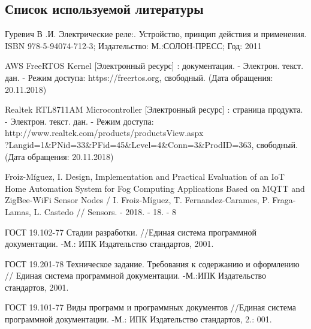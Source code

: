 \subsection*{ Список используемой литературы}
\begin{my_enumerate}

\item
Гуревич В .И. Электрические реле:. Устройство, принцип действия и применения. ISBN 978-5-94074-712-3; Издательство: М.:СОЛОН-ПРЕСС; Год: 2011 \\

\item
AWS FreeRTOS Kernel  [Электронный ресурс] : документация. - Электрон. текст. дан. - Режим доступа: https://freertos.org, свободный. (Дата обращения: 20.11.2018) \\

\item 	
Realtek RTL8711AM Microcontroller [Электронный ресурс] : страница продукта. - Электрон. текст. дан. - Режим доступа: http://www.realtek.com/products/productsView.aspx \\ 
?Langid=1\&PNid=33\&PFid=45\&Level=4\&Conn=3\&ProdID=363, свободный. (Дата обращения: 20.11.2018) \\

\item Froiz-Míguez, I. Design, Implementation and Practical Evaluation of an IoT Home Automation System for Fog Computing Applications Based on MQTT and ZigBee-WiFi Sensor Nodes / I. Froiz-Míguez, T. Fernandez-Carames, P. Fraga-Lamas, L. Castedo // Sensors. - 2018. - 18. - 8

\item
ГОСТ 19.102-77 Стадии разработки. //Единая система программной документации. -М.: ИПК Издательство стандартов, 2001.

\item
ГОСТ 19.201-78 Техническое задание. Требования к содержанию и оформлению // Единая система программной документации. -М.:ИПК Издательство стандартов, 2001.

\item
ГОСТ 19.101-77 Виды программ и программных документов //Единая система программной документации. -М.: ИПК Издательство стандартов, 2.: 001.


\end{my_enumerate}

